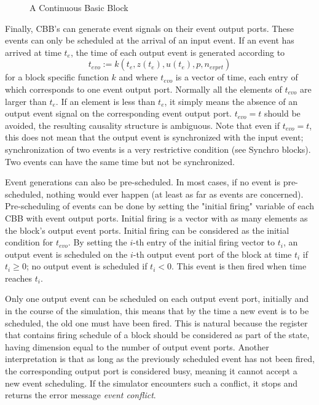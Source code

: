 \documentclass{book}
\newcommand{\logical}{{Synchro }}
\begin{document}
\begin{figure}[ht]

\caption{A Continuous Basic Block}
\label{cbb}
\end{figure}


Finally, CBB's can generate event signals on their event output
ports. These events can only be scheduled at the arrival of an input
event. If an event has arrived at time $t_e$, the time of each output event 
is generated according to
\begin{equation}
t_{evo} := k(t_e,z(t_e),u(t_e),p,n_{evprt})  \label{e20}
\end{equation}
for a block specific function $k$ and where $t_{evo}$ is a vector of
time, each entry of which corresponds to one event output port. Normally all
the elements of $t_{evo}$ are larger than  $t_e$. If an
element is less than $t_e$, it simply means the absence of an output
event signal on the corresponding event output port. $t_{evo}=t$
should be avoided, the resulting causality structure is ambiguous.
Note that even if
$t_{evo}=t$, this does not mean that the output event is synchronized
with the input event; synchronization of two events is a very restrictive
condition (see \logical
blocks). Two events can have the same time but not be synchronized.

Event generations can also be pre-scheduled. In most cases, if no event
is pre-scheduled, nothing would ever happen (at least as far as events are
concerned). Pre-scheduling of events can  be done by setting the "initial 
firing" variable of each CBB with event output ports. 
Initial firing is a vector with as many 
elements as the block's output event ports. Initial firing can be
considered as the initial condition for $t_{evo}$. By setting  the
$i$-th entry of the initial firing vector to $t_i$, an output event is
scheduled on the $i$-th output event port of the block at time $t_i$ if
$t_i\ge 0$; no output event is scheduled if $t_i<0$. This event is
then fired when time reaches $t_i$.

Only one output event can be scheduled on each output
event port, initially and in the course of the simulation, this means
that by the time a new event is to be scheduled, the old one must have been
fired. This is natural because the register that contains firing
schedule of a block should be considered as part of the state, having
dimension equal to the number of output event ports. 
Another
interpretation is that as long as the previously scheduled event has
not been fired, the corresponding output port is considered busy, meaning it cannot
accept a new event scheduling. If the simulator encounters such a 
conflict, it stops and returns the error message {\em event
conflict}. 
\end{document}
